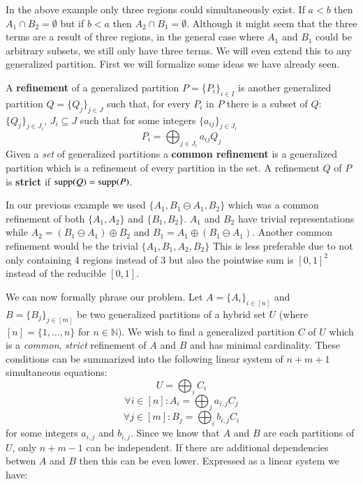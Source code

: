 In the above example only three regions could simultaneously exist.
If $a<b$ then $A_1 \cap B_2 = \emptyset$ but if $b<a$ then $A_2 \cap B_1 = \emptyset$.
Although it might seem that the three terms are a result of three regions, in the general case where 
$A_1$ and $B_1$ could be arbitrary subsets, we still only have three terms.
We will even extend this to any generalized partition.
First we will formalize some ideas we have already seen.


\begin{definition}
	A \textbf{refinement} of a generalized partition $P = \{P_i\}_{i \in I}$ is another generalized partition
	$Q = \{Q_j \}_{j \in J}$ such that, for every $P_i$ in $P$ there is a subset of $Q$: $\{ Q_{j} \}_{j \in J_i}$, 
	$J_i \subseteq J$ such that for some integers $\{a_{ij}\}_{j \in J_i}$
	\begin{equation}
		P_i = \bigoplus_{j \in J_i} a_{ij} Q_{j}
	\end{equation}
	Given a \emph{set} of generalized partitions a \textbf{common refinement} is a generalized partition which is a 
	refinement of every partition in the set. 
	A refinement $Q$ of $P$ is \textbf{strict} if $\text{supp}(Q) = \text{supp}(P)$.
\end{definition}


In our previous example we used $\{ A_1, B_1 \ominus A_1, B_2 \}$ which was a common refinement of both
$\{ A_1, A_2 \}$ and $\{ B_1, B_2 \}$.
$A_1$ and $B_2$ have trivial representations while $A_2 = (B_1 \ominus A_1) \oplus B_2$ and 
$B_1 = A_1 \oplus (B_1 \ominus A_1)$.
Another common refinement would be the trivial $\{ A_1, B_1, A_2, B_2 \}$
This is less preferable due to not only containing 4 regions instead of 3 but also the pointwise sum is $[0,1]^2$
instead of the reducible $[0,1]$.

We can now formally phrase our problem.
Let $A=\{ A_i \}_{i \in [n]}$ and $B=\{ B_j \}_{j \in [m]}$ be two generalized partitions of a hybrid set $U$ 
(where $[n] = \{ 1, \ldots, n \}$ for $n \in \mathbb{N}$).
We wish to find a generalized partition $C$  of $U$ which is a \emph{common}, \emph{strict} refinement of $A$ and $B$
and has minimal cardinality.
These conditions can be summarized into the following linear system of $n+m+1$ simultaneous equations:
\begin{equation}
	U = \bigoplus_i C_i
\end{equation}
\begin{equation}
	\forall i \in [n] : A_i = \bigoplus_j  a_{i,j} C_j
\end{equation}
\begin{equation}
	\forall j \in [m] : B_j = \bigoplus_i b_{i,j} C_i
\end{equation}
for some integers $a_{i,j}$ and $b_{i,j}$.
Since we know that $A$ and $B$ are each partitions of $U$, only $n+m-1$ can be independent.
If there are additional dependencies betwen $A$ and $B$ then this can be even lower.
Expressed as a linear system we have:


